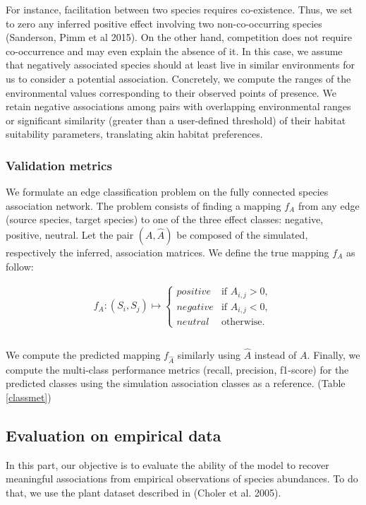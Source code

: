 \documentclass[]{article}
\begin{document}
\noindent For instance, facilitation between two species requires co-existence. Thus, we set to zero any inferred positive effect involving two non-co-occurring species (Sanderson, Pimm et al 2015). On the other hand, competition does not require co-occurrence and may even explain the absence of it. In this case, we assume that negatively associated species should at least live in similar environments for us to consider a potential association. Concretely, we compute the ranges of the environmental values corresponding to their observed points of presence. We retain negative associations among pairs with overlapping environmental ranges or significant similarity (greater than a user-defined threshold) of their habitat suitability parameters, translating akin habitat preferences. 

\subsubsection{Validation metrics}
We formulate an edge classification problem on the fully connected species association network. The problem consists of finding a mapping $f_A$ from any edge (source species, target species) to one of the three effect classes: negative, positive, neutral. Let the pair $(A,\hat{A})$ be composed of the simulated, respectively the inferred, association matrices. We define the true mapping $f_A$ as follow:

\begin{equation*}
\begin{matrix}
f_A : (S_i,S_j) \mapsto  \left\{
\begin{array}{ll}
positive & \mbox{if } A_{i,j}>0, \\
negative & \mbox{if } A_{i,j}<0, \\
neutral & \mbox{otherwise.}
\end{array}
\right.\\\\
\end{matrix}
\end{equation*}

\noindent We compute the predicted mapping $f_{\hat{A}}$ similarly using $\hat{A}$ instead of $A$. Finally, we compute the multi-class performance metrics (recall, precision, f1-score) for the predicted classes using the simulation association classes as a reference. (Table \ref{classmet})   

\subsection{Evaluation on empirical data}
In this part, our objective is to evaluate the ability of the model to recover meaningful associations from empirical observations of species abundances. To do that, we use the plant dataset described in (Choler et al. 2005). 
\end{document}
